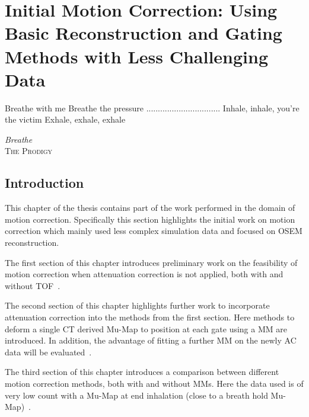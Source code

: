 \chapter{Initial Motion Correction: Using Basic Reconstruction and Gating Methods with Less Challenging Data} \label{sec:initial_motion_correction_using_basic_reconstruction_and_gating_methods_with_less_challenging_data}
    \vspace*{\fill}
    \setlength{\epigraphwidth}{0.4\linewidth}
    \renewcommand{\epigraphflush}{flushright}
    \renewcommand{\epigraphsize}{\footnotesize}
    \epigraph{Breathe with me\newline
              Breathe the pressure\newline
              ................................\newline
              Inhale, inhale, you're the victim\newline
              Exhale, exhale, exhale}%
              {\textit{Breathe}\\ \textsc{The Prodigy}}
    
    \newpage
    
    \section{Introduction} \label{sec:initial_motion_correction_using_basic_reconstruction_and_gating_methods_with_less_challenging_data_introduction}
        This chapter of the thesis contains part of the work performed in the domain of motion correction. Specifically this section highlights the initial work on motion correction which mainly used less complex simulation data and focused on \gls{OSEM} reconstruction.
        
        The first section of this chapter introduces preliminary work on the feasibility of motion correction when attenuation correction is not applied, both with and without \gls{TOF}~\parencite{Whitehead2019ImpactPET}.
        
        The second section of this chapter highlights further work to incorporate attenuation correction into the methods from the first section. Here methods to deform a single \gls{CT} derived \gls{Mu-Map} to position at each gate using a \gls{MM} are introduced. In addition, the advantage of fitting a further \gls{MM} on the newly \gls{AC} data will be evaluated~\parencite{Whitehead2020PET/CTFields}.
        
        The third section of this chapter introduces a comparison between different motion correction methods, both with and without \glspl{MM}. Here the data used is of very low count with a \gls{Mu-Map} at end inhalation (close to a breath hold \gls{Mu-Map})~\parencite{Whitehead2021ComparisonMap}.
        
